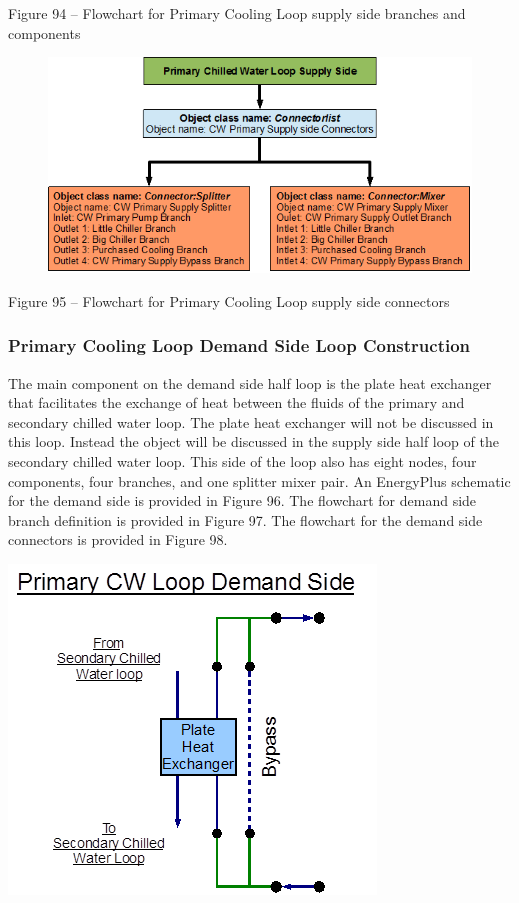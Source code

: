 Figure 94 -- Flowchart for Primary Cooling Loop supply side branches and components

\begin{figure}[htbp]
\centering
\includegraphics{media/image095.png}
\caption{}
\end{figure}

Figure 95 -- Flowchart for Primary Cooling Loop supply side connectors

\subsubsection{Primary Cooling Loop Demand Side Loop Construction}\label{primary-cooling-loop-demand-side-loop-construction}

The main component on the demand side half loop is the plate heat exchanger that facilitates the exchange of heat between the fluids of the primary and secondary chilled water loop. The plate heat exchanger will not be discussed in this loop. Instead the object will be discussed in the supply side half loop of the secondary chilled water loop. This side of the loop also has eight nodes, four components, four branches, and one splitter mixer pair. An EnergyPlus schematic for the demand side is provided in Figure 96. The flowchart for demand side branch definition is provided in Figure 97. The flowchart for the demand side connectors is provided in Figure 98.

\textbf{\includegraphics{media/image096.png}}

